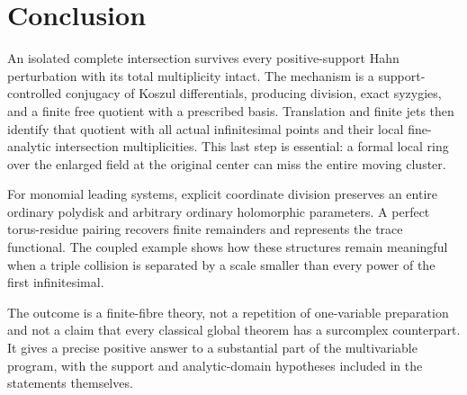 \documentclass[11pt,letterpaper]{article}
\theoremstyle{definition}
\theoremstyle{remark}
\numberwithin{equation}{section}
\begin{document}
\section{Conclusion}
An isolated complete intersection survives every positive-support Hahn perturbation with its total multiplicity intact. The mechanism is a support-controlled conjugacy of Koszul differentials, producing division, exact syzygies, and a finite free quotient with a prescribed basis. Translation and finite jets then identify that quotient with all actual infinitesimal points and their local fine-analytic intersection multiplicities. This last step is essential: a formal local ring over the enlarged field at the original center can miss the entire moving cluster.

For monomial leading systems, explicit coordinate division preserves an entire ordinary polydisk and arbitrary ordinary holomorphic parameters. A perfect torus-residue pairing recovers finite remainders and represents the trace functional. The coupled example shows how these structures remain meaningful when a triple collision is separated by a scale smaller than every power of the first infinitesimal.

The outcome is a finite-fibre theory, not a repetition of one-variable preparation and not a claim that every classical global theorem has a surcomplex counterpart. It gives a precise positive answer to a substantial part of the multivariable program, with the support and analytic-domain hypotheses included in the statements themselves.

\appendix
\end{document}
